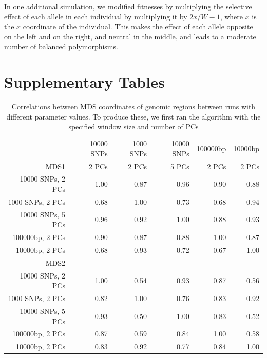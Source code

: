 \documentclass[11pt, oneside]{article}   	%
\newif\ifsubmission
\begin{document}
In one additional simulation, we modified fitnesses by multiplying the selective effect
of each allele in each individual by multiplying it by $2x/W - 1$, 
where $x$ is the $x$ coordinate of the individual.
This makes the effect of each allele opposite on the left and on the right,
and neutral in the middle,
and leads to a moderate number of balanced polymorphisms.


\ifsubmission
    \listoffigures
    \clearpage
\fi

\section{Supplementary Tables}

\begin{table}[ht]
\centering
    \begin{tabular}{rrrrrr}
      \hline
          & 10000 SNPs & 1000 SNPs & 10000 SNPs & 100000bp & 10000bp \\ 
     MDS1 & 2 PCs & 2 PCs & 5 PCs & 2 PCs & 2 PCs \\ 
      \hline
  10000 SNPs, 2 PCs & 1.00 & 0.87 & 0.96 & 0.90 & 0.88 \\ 
  1000 SNPs, 2 PCs & 0.68 & 1.00 & 0.73 & 0.68 & 0.94 \\ 
  10000 SNPs, 5 PCs & 0.96 & 0.92 & 1.00 & 0.88 & 0.93 \\ 
  100000bp, 2 PCs & 0.90 & 0.87 & 0.88 & 1.00 & 0.87 \\ 
  10000bp, 2 PCs & 0.68 & 0.93 & 0.72 & 0.67 & 1.00 \\ 
       \hline
       \hline
        MDS2 & &&&&\\
      \hline
      10000 SNPs, 2 PCs & 1.00 & 0.54 & 0.93 & 0.87 & 0.56 \\ 
      1000 SNPs, 2 PCs & 0.82 & 1.00 & 0.76 & 0.83 & 0.92 \\ 
      10000 SNPs, 5 PCs & 0.93 & 0.50 & 1.00 & 0.83 & 0.52 \\ 
      100000bp, 2 PCs & 0.87 & 0.59 & 0.84 & 1.00 & 0.58 \\ 
      10000bp, 2 PCs & 0.83 & 0.92 & 0.77 & 0.84 & 1.00 \\ 
       \hline
    \end{tabular}
    \caption{
        Correlations between MDS coordinates of genomic regions
        between runs with different parameter values.
        To produce these, 
        we first ran the algorithm with the specified window size and number of PCs 
}
\end{table}
\end{document}
